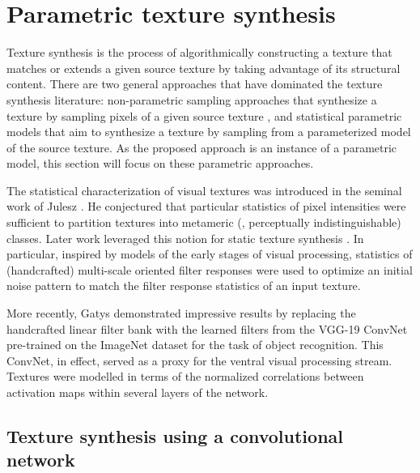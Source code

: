 \section{Parametric texture synthesis}

Texture synthesis is the process of algorithmically constructing a texture that
matches or extends a given source texture by taking advantage of its structural 
content. There are two general approaches that have dominated the texture
synthesis literature: non-parametric sampling approaches that
synthesize a texture by sampling pixels of a given source texture
\cite{efros1999,kwatra2003graphcut,schodl2000,wei2000}, and 
statistical parametric models that aim to synthesize a texture by sampling
from a parameterized model of the source texture.
As the proposed approach is an instance of a parametric model, this section 
will focus on these parametric approaches.

The statistical characterization of visual textures was introduced
in the seminal work of Julesz \cite{julesz1962}.
He conjectured that particular statistics of pixel intensities
were sufficient to partition textures into metameric (\ie,
perceptually indistinguishable) classes. 
Later work leveraged this notion for static texture synthesis
\cite{heeger1995pyramid,portilla2000parametric}.
In particular, inspired by models of the early stages of visual 
processing, statistics of (handcrafted) multi-scale oriented filter 
responses were used to optimize an initial noise pattern 
to match the filter response statistics of an input texture.

More recently, Gatys \etal \cite{gatys2015} demonstrated
impressive results by replacing the handcrafted linear filter bank with the learned filters from the VGG-19
\cite{simonyan2014very} ConvNet pre-trained on the ImageNet \cite{russakovsky2015} dataset for the task of object
recognition. This ConvNet, in effect, served as a proxy for the ventral visual
processing stream. 
Textures were modelled in terms of the normalized correlations between activation maps within several layers of the network.

\subsection{Texture synthesis using a convolutional network}
\label{sec:texture_synthesis_using_a_convnet}


